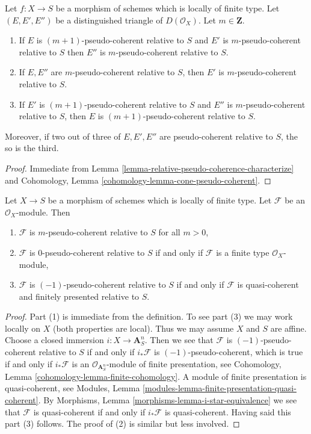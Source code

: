 \begin{lemma}
\label{lemma-cone-relatively-pseudo-coherent}
Let $f : X \to S$ be a morphism of schemes which is locally of finite type.
Let $(E, E', E'')$ be a distinguished triangle of
$D(\mathcal{O}_X)$. Let $m \in \mathbf{Z}$.
\begin{enumerate}
\item If $E$ is $(m + 1)$-pseudo-coherent relative to $S$ and
$E'$ is $m$-pseudo-coherent relative to $S$ then $E''$ is
$m$-pseudo-coherent relative to $S$.
\item If $E, E''$ are $m$-pseudo-coherent relative to $S$,
then $E'$ is $m$-pseudo-coherent relative to $S$.
\item If $E'$ is $(m + 1)$-pseudo-coherent relative to $S$
and $E''$ is $m$-pseudo-coherent relative to $S$, then
$E$ is $(m + 1)$-pseudo-coherent relative to $S$.
\end{enumerate}
Moreover, if two out of three of $E, E', E''$ are pseudo-coherent
relative to $S$, the so is the third.
\end{lemma}

\begin{proof}
Immediate from Lemma \ref{lemma-relative-pseudo-coherence-characterize} and
Cohomology, Lemma \ref{cohomology-lemma-cone-pseudo-coherent}.
\end{proof}

\begin{lemma}
\label{lemma-rel-n-pseudo-module}
Let $X \to S$ be a morphism of schemes which is locally of finite type.
Let $\mathcal{F}$ be an $\mathcal{O}_X$-module. Then
\begin{enumerate}
\item $\mathcal{F}$ is $m$-pseudo-coherent relative to $S$ for all $m > 0$,
\item $\mathcal{F}$ is $0$-pseudo-coherent relative to $S$ if and only if
$\mathcal{F}$ is a finite type $\mathcal{O}_X$-module,
\item $\mathcal{F}$ is $(-1)$-pseudo-coherent relative to $S$ if and only if
$\mathcal{F}$ is quasi-coherent and finitely presented relative to $S$.
\end{enumerate}
\end{lemma}

\begin{proof}
Part (1) is immediate from the definition. To see part (3)
we may work locally on $X$ (both properties are local). Thus we
may assume $X$ and $S$ are affine. Choose a closed immersion
$i : X \to \mathbf{A}^n_S$. Then we see that $\mathcal{F}$ is
$(-1)$-pseudo-coherent relative to $S$ if and only if $i_*\mathcal{F}$
is $(-1)$-pseudo-coherent, which is true if and only if $i_*\mathcal{F}$
is an $\mathcal{O}_{\mathbf{A}^n_S}$-module of finite presentation, see
Cohomology, Lemma \ref{cohomology-lemma-finite-cohomology}.
A module of finite presentation is quasi-coherent, see
Modules, Lemma \ref{modules-lemma-finite-presentation-quasi-coherent}.
By Morphisms, Lemma \ref{morphisms-lemma-i-star-equivalence}
we see that $\mathcal{F}$ is quasi-coherent if and only if $i_*\mathcal{F}$
is quasi-coherent. Having said this part (3) follows. The proof of (2)
is similar but less involved.
\end{proof}

